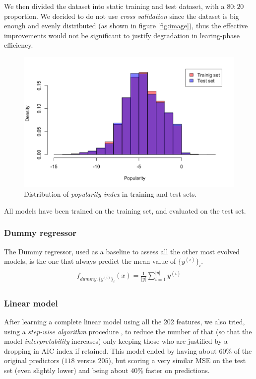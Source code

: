 \documentclass[letterpaper,11pt,english,twocolumn]{article}
\begin{document}
We then divided the dataset into static training and test dataset, with a $80:20$ proportion. We decided to do not use \textit{cross validation} since the dataset is big enough and evenly distributed (as shown in figure \autoref{fig:image}), thus the effective improvements would not be significant to justify degradation in learing-phase efficiency.

\begin{figure}
    \centering
    \includegraphics[width=.5\textwidth]{./images/hist.png}
    \caption{Distribution of \textit{popularity index} in training and test sets.}
    \label{fig:image}
\end{figure}

All models have been trained on the training set, and evaluated on the test set.

\subsubsection{Dummy regressor}
The Dummy regressor, used as a baseline to assess all the other most evolved models, is the one that always predict the mean value of $\{y^{(i)}\}_i$.
\begin{align*}
\begin{gathered}
	f_{dummy,\{y^{(i)}\}_i} (x) = \frac{1}{|y|} \sum_{i=1}^{|y|} y^{(i)} 
\end{gathered}
\end{align*}


\subsubsection{Linear model}
After learning a complete linear model using all the 202 features, we also tried, using a \textit{step-wise algorithm} procedure \cite{10.48550/ARXIV.1605.01936}, to reduce the number of that (so that the model \textit{interpretability} increases) only keeping those who are justified by a dropping in AIC index if retained. This model ended by having about $60\%$ of the original predictors ($118$ versus $205$), but scoring a very similar MSE on the test set (even slightly lower) and being about $40\%$ faster on predictions.
\end{document}
